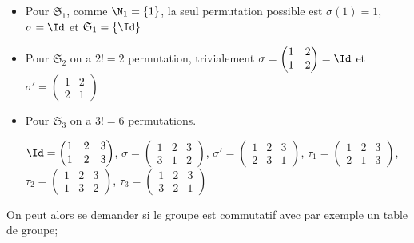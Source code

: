 \begin{ex}
\begin{itemize}
\item Pour $\mathfrak{S}_1$, comme $\N_1=\{1\}$, la seul permutation possible est $\sigma(1)=1$, $\sigma=\Id$ et $\mathfrak{S}_1=\{\Id\}$
\item Pour $\mathfrak{S}_2$ on a $2!=2$ permutation, trivialement $\sigma=\begin{pmatrix}
    1 & 2  \\
    1 & 2  
\end{pmatrix}=\Id$ et $\sigma'=\begin{pmatrix}
1 & 2  \\
2 & 1 
\end{pmatrix}$
\item Pour $\mathfrak{S}_3$ on a $3!=6$ permutations.

$\Id=\begin{pmatrix}
1 & 2 & 3  \\
1 & 2 & 3 
\end{pmatrix}$, $\sigma=\begin{pmatrix}
1 & 2 & 3  \\
3 & 1 & 2 
\end{pmatrix}$, $\sigma'=\begin{pmatrix}
1 & 2 & 3  \\
2 & 3 & 1 
\end{pmatrix}$, $\tau_1=\begin{pmatrix}
1 & 2 & 3  \\
2 & 1 & 3 
\end{pmatrix}$, $\tau_2=\begin{pmatrix}
1 & 2 & 3  \\
1 & 3 & 2 
\end{pmatrix}$, $\tau_3=\begin{pmatrix}
1 & 2 & 3  \\
3 & 2 & 1
\end{pmatrix}$
\end{itemize}
On peut alors se demander si le groupe est commutatif avec par exemple un table de groupe;
\end{ex}

